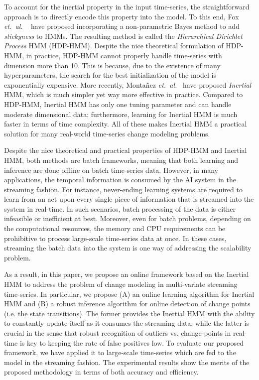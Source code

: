 To account for the inertial property in the input time-series, the
straightforward approach is to directly encode this property into the model. To
this end, Fox \emph{et.\ al.} ~\cite{fox2011sticky} have proposed incorporating
a non-parametric Bayes method to add \emph{stickyness} to HMMs. The resulting
method is called the \emph{Hierarchical Dirichlet Process} HMM (HDP-HMM).
Despite the nice theoretical formulation of HDP-HMM, in practice, HDP-HMM cannot
properly handle time-series with dimension more than 10. This is because, due
to the existence of many hyperparameters, the search for the best
initialization of the model is exponentially expensive. More recently,
Monta\~nez \emph{et.\ al.}~ have proposed
\emph{Inertial} HMM, which is much simpler yet way more effective in practice.
Compared to HDP-HMM, Inertial HMM has only one tuning parameter and can handle moderate
dimensional data; furthermore, learning for Inertial HMM is much faster in
terms of time complexity. All of these makes Inertial HMM a practical solution
for many real-world time-series change modeling problems.

Despite the nice theoretical and practical properties of HDP-HMM and Inertial
HMM, both methods are batch frameworks, meaning that both learning and inference
are done offline on batch time-series data. However, in many applications, the
temporal information is consumed by the AI system in the streaming fashion. For
instance, never-ending learning systems are required to learn from an act upon
every single piece of information that is streamed into the system in real-time.
In such scenarios, batch processing of the data is either infeasible or
inefficient at best. Moreover, even for batch problems, depending on the
computational resources, the memory and CPU requirements can be prohibitive to
process large-scale time-series data at once. In these cases, streaming the
batch data into the system is one way of addressing the scalability problem.

As a result, in this paper, we propose an online framework based on the Inertial
HMM to address the problem of change modeling in multi-variate streaming
time-series. In particular, we propose (A) an online learning algorithm for
Inertial HMM and (B) a robust inference algorithm for online detection of change
points (i.e. the state transitions). The former provides the 
Inertial HMM with the ability to constantly update itself as it consumes the
streaming data, while the latter is crucial in the sense that
robust recognition of outliers vs. change-points in real-time is key to
keeping the rate of false positives low. To evaluate our proposed framework, we
have applied it to large-scale time-series which are fed to the model in the
streaming fashion. The experimental results show the merits of the proposed
methodology in terms of both accuracy and efficiency.

